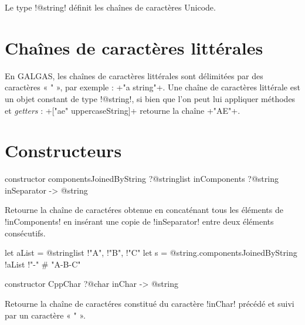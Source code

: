 



Le type \ggst!@string! définit les chaînes de caractères Unicode.

\section{Chaînes de caractères littérales}

En GALGAS, les chaînes de caractères littérales sont délimitées par des caractères « " », par exemple : \ggst+"a string"+. Une chaîne de caractères littérale est un objet constant de type \ggst!@string!, si bien que l'on peut lui appliquer méthodes et \emph{getters} : \ggst+["ae" uppercaseString]+ retourne la chaîne \ggst+"AE"+.







\section{Constructeurs}


\begin{galgas3box}
constructor componentsJoinedByString
   ?@stringlist inComponents
   ?@string inSeparator -> @string
\end{galgas3box}

Retourne la chaîne de caractéres obtenue en concaténant tous les éléments de \ggst!inComponents! en insérant une copie de \ggst!inSeparator! entre deux éléments consécutifs.

\begin{galgas3}
let aList = @stringlist {!"A", !"B", !"C"}
let s = @string.componentsJoinedByString {!aList !"-"} # "A-B-C"
\end{galgas3}





\begin{galgas3box}
constructor CppChar ?@char inChar -> @string
\end{galgas3box}

Retourne la chaîne de caractéres constitué du caractère \ggst!inChar! précédé et suivi par un caractère « " ».


